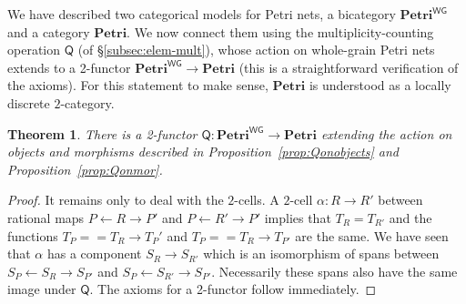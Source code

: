 \documentclass[11pt,a4paper]{article}
\theoremstyle{plain}
\newtheorem{theorem}{Theorem}[section]
\theoremstyle{definition}
\theoremstyle{remark}
\newcommand{\Petri}{\mathbf{Petri}}
\newcommand{\WGPetri}{\mathbf{Petri}^{\mathsf{WG}}}
\newcommand{\Q}{\mathsf{Q}}
\begin{document}
We have described two categorical models for Petri nets, a bicategory $\WGPetri$ and a category $\Petri$. We now connect them using the multiplicity-counting operation $\Q$ (of \S\ref{subsec:elem-mult}), whose action on whole-grain Petri nets extends to a 2-functor $\WGPetri \to \Petri$ (this is a straightforward verification of the axioms). For this statement to make sense, $\Petri$ is understood as a locally discrete $2$-category.
\begin{theorem}
There is a 2-functor $\Q : \WGPetri \to \Petri$ extending the action on objects and morphisms described in Proposition~\ref{prop:Qonobjects} and Proposition~\ref{prop:Qonmor}.
\end{theorem}
\begin{proof}
  It remains only to deal with the $2$-cells. A $2$-cell $\alpha : R \to R'$ between rational maps $P \leftarrow R \rightarrow P'$ and $P \leftarrow R' \rightarrow P'$  implies that $T_R = T_{R'}$ and the functions $T_P =\!= T_R \to T_P'$ and $T_P =\!= T_R \to T_{P'}$ are the same. We have seen that $\alpha$ has a component $S_R \to S_{R'}$ which is an isomorphism of spans between $S_P \leftarrow S_R \rightarrow S_{P'}$ and $S_P \leftarrow S_{R'} \rightarrow S_{P'}$. Necessarily these spans also have the same image under $\Q$. The axioms for a 2-functor follow immediately.
\end{proof}
\end{document}
